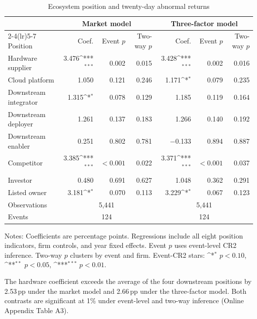 \documentclass[review,12pt,authoryear]{elsarticle}
\newcommand{\pp}{\,pp}
\newcommand{\sym}[1]{\ifmmode^{#1}\else\(^{#1}\)\fi}
\begin{document}
\begin{table}[t!]
\centering
\begin{threeparttable}
\caption{Ecosystem position and twenty-day abnormal returns}
\label{tab:position}
\scriptsize
\setlength{\tabcolsep}{3.2pt}
\begin{tabular}{lrrrrrr}
\toprule
& \multicolumn{3}{c}{Market model}
& \multicolumn{3}{c}{Three-factor model} \\
\cmidrule(lr){2-4}\cmidrule(lr){5-7}
Position & Coef. & Event $p$ & Two-way $p$
& Coef. & Event $p$ & Two-way $p$ \\
\midrule
Hardware supplier      & 3.476\sym{***} & 0.002 & 0.015 & 3.428\sym{***} & 0.002 & 0.016 \\
Cloud platform         & 1.050 & 0.121 & 0.246 & 1.171\sym{*} & 0.079 & 0.235 \\
Downstream integrator  & 1.315\sym{*} & 0.078 & 0.129 & 1.185 & 0.119 & 0.164 \\
Downstream deployer    & 1.261 & 0.137 & 0.183 & 1.266 & 0.140 & 0.192 \\
Downstream enabler     & 0.251 & 0.802 & 0.781 & $-$0.133 & 0.894 & 0.887 \\
Competitor             & 3.385\sym{***} & $<0.001$ & 0.022 & 3.371\sym{***} & $<0.001$ & 0.037 \\
Investor               & 0.480 & 0.691 & 0.627 & 1.048 & 0.362 & 0.291 \\
Listed owner           & 3.181\sym{*} & 0.070 & 0.113 & 3.229\sym{*} & 0.067 & 0.123 \\
\midrule
Observations           & \multicolumn{3}{c}{5,441}
                       & \multicolumn{3}{c}{5,441} \\
Events                 & \multicolumn{3}{c}{124}
                       & \multicolumn{3}{c}{124} \\
\bottomrule
\end{tabular}
\begin{tablenotes}\footnotesize
\item Notes: Coefficients are percentage points. Regressions include all
eight position indicators, firm controls, and year fixed effects. Event
$p$ uses event-level CR2 inference. Two-way $p$ clusters by event and firm.
Event-CR2 stars: \sym{*} $p<0.10$, \sym{**} $p<0.05$,
\sym{***} $p<0.01$.
\end{tablenotes}
\end{threeparttable}
\end{table}

The hardware coefficient exceeds the average of the four downstream
positions by 2.53\pp{} under the market model and 2.66\pp{} under the
three-factor model. Both contrasts are significant at 1\% under event-level
and two-way inference (Online Appendix Table A3).
\end{document}
